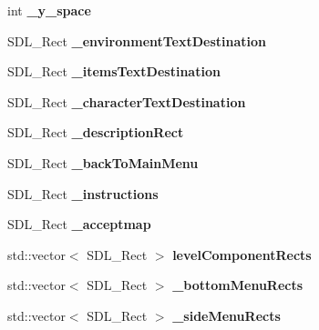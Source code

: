 \begin{DoxyCompactItemize}
\item 
\hypertarget{class_level_editor_a34112286b5c504f821cd927151ae6650}{}\label{class_level_editor_a34112286b5c504f821cd927151ae6650} 
int {\bfseries \+\_\+y\+\_\+space}
\item 
\hypertarget{class_level_editor_a7ae9e99503c69ff249c819e461a2f32e}{}\label{class_level_editor_a7ae9e99503c69ff249c819e461a2f32e} 
S\+D\+L\+\_\+\+Rect {\bfseries \+\_\+environment\+Text\+Destination}
\item 
\hypertarget{class_level_editor_ac35947c5c6b27639072f173a0be18b62}{}\label{class_level_editor_ac35947c5c6b27639072f173a0be18b62} 
S\+D\+L\+\_\+\+Rect {\bfseries \+\_\+items\+Text\+Destination}
\item 
\hypertarget{class_level_editor_a49fceaefcc539e091b639d4b6f22cd9c}{}\label{class_level_editor_a49fceaefcc539e091b639d4b6f22cd9c} 
S\+D\+L\+\_\+\+Rect {\bfseries \+\_\+character\+Text\+Destination}
\item 
\hypertarget{class_level_editor_a7ae29c1080fbf75227da731d4c8da5b7}{}\label{class_level_editor_a7ae29c1080fbf75227da731d4c8da5b7} 
S\+D\+L\+\_\+\+Rect {\bfseries \+\_\+description\+Rect}
\item 
\hypertarget{class_level_editor_a566bbf3a0c17e3a2578cb7a4ac964b0c}{}\label{class_level_editor_a566bbf3a0c17e3a2578cb7a4ac964b0c} 
S\+D\+L\+\_\+\+Rect {\bfseries \+\_\+back\+To\+Main\+Menu}
\item 
\hypertarget{class_level_editor_a82113df9c2eb5e96f0c7d045eb030c4e}{}\label{class_level_editor_a82113df9c2eb5e96f0c7d045eb030c4e} 
S\+D\+L\+\_\+\+Rect {\bfseries \+\_\+instructions}
\item 
\hypertarget{class_level_editor_a115b776f4ce4629251cef10568f88028}{}\label{class_level_editor_a115b776f4ce4629251cef10568f88028} 
S\+D\+L\+\_\+\+Rect {\bfseries \+\_\+acceptmap}
\item 
\hypertarget{class_level_editor_a3a791421beb7e01dd0cf6bcc5aea03eb}{}\label{class_level_editor_a3a791421beb7e01dd0cf6bcc5aea03eb} 
std\+::vector$<$ S\+D\+L\+\_\+\+Rect $>$ {\bfseries level\+Component\+Rects}
\item 
\hypertarget{class_level_editor_aad318011794b09af370630436cf2c7c2}{}\label{class_level_editor_aad318011794b09af370630436cf2c7c2} 
std\+::vector$<$ S\+D\+L\+\_\+\+Rect $>$ {\bfseries \+\_\+bottom\+Menu\+Rects}
\item 
\hypertarget{class_level_editor_ab7042d7db24dbf9a6758741d06c30a70}{}\label{class_level_editor_ab7042d7db24dbf9a6758741d06c30a70} 
std\+::vector$<$ S\+D\+L\+\_\+\+Rect $>$ {\bfseries \+\_\+side\+Menu\+Rects}

\end{DoxyCompactItemize}

